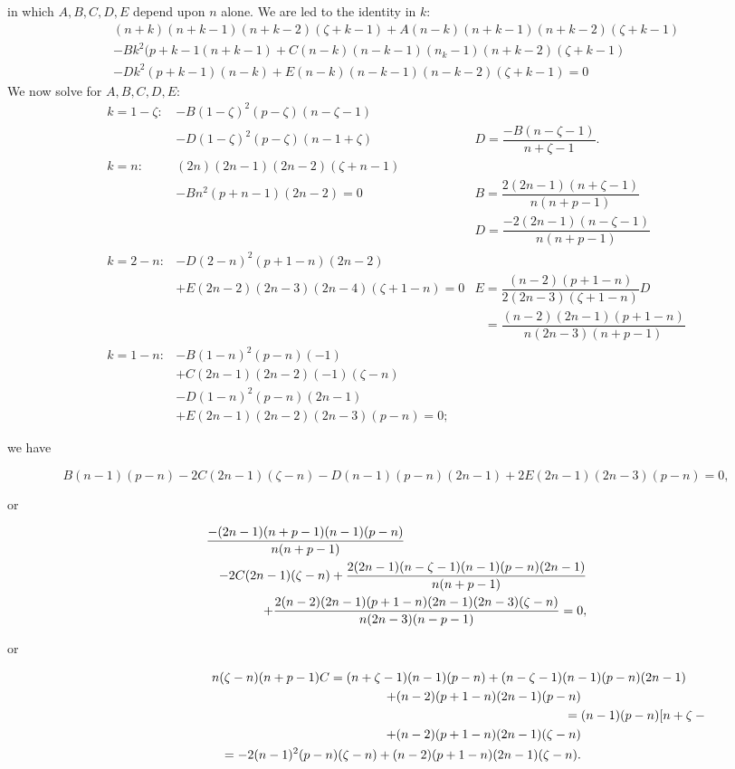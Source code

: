 \begin{solution}
in which $A,B,C,D,E$ depend upon $n$ alone. We are led to the identity in $k$:
$$\begin{array}{ll}
(n+k)(n+k-1)(n+k-2)(\zeta+k-1)+A(n-k)(n+k-1)(n+k-2)(\zeta+k-1) \\
-Bk^2(p+k-1(n+k-1) + C(n-k)(n-k-1)(n_k-1)(n+k-2)(\zeta+k-1) \\
- Dk^2(p+k-1)(n-k)+E (n-k)(n-k-1)(n-k-2)(\zeta+k-1)=0
\end{array}$$
We now solve for $A,B,C,D,E:$
$$\begin{array}{lll}
k=1-\zeta: & -B(1-\zeta)^2(p-\zeta)(n-\zeta-1) \\
& -D(1-\zeta)^2(p-\zeta)(n-1+\zeta) & D = \dfrac{-B(n-\zeta-1)}{n+\zeta-1}. \\
k=n: & (2n)(2n-1)(2n-2)(\zeta+n-1) \\
& -Bn^2(p+n-1)(2n-2)=0 & B= \dfrac{2(2n-1)(n+\zeta-1)}{n(n+p-1)} \\
& & D = \dfrac{-2(2n-1)(n-\zeta-1)}{n(n+p-1)} \\
k=2-n: & -D(2-n)^2(p+1-n)(2n-2) \\
& +E(2n-2)(2n-3)(2n-4)(\zeta+1-n)=0 & E = \dfrac{(n-2)(p+1-n)}{2(2n-3)(\zeta+1-n)}D \\
&& \phantom{E}=\dfrac{(n-2)(2n-1)(p+1-n)}{n(2n-3)(n+p-1)} \\
k=1-n: & -B(1-n)^2(p-n)(-1) \\
& + C(2n-1)(2n-2)(-1)(\zeta-n) \\
& -D(1-n)^2(p-n)(2n-1) \\
& +E(2n-1)(2n-2)(2n-3)(p-n)=0;
\end{array}$$

we have

$$B(n-1)(p-n)-2C(2n-1)(\zeta-n)-D(n-1)(p-n)(2n-1)+2E(2n-1)(2n-3)(p-n)=0,$$

or

\begin{eqnarray*}
\lefteqn{\dfrac{-(2n-1)(n+p-1)(n-1)(p-n)}{n(n+p-1)}} \\
& & - 2C(2n-1)(\zeta-n) + \dfrac{2(2n-1)(n-\zeta-1)(n-1)(p-n)(2n-1)}{n(n+p-1)} \\
& & + \dfrac{2(n-2)(2n-1)(p+1-n)(2n-1)(2n-3)(\zeta-n)}{n(2n-3)(n-p-1)} = 0,
\end{eqnarray*}

or

\begin{eqnarray*}
\lefteqn{n(\zeta-n)(n+p-1)C = (n+\zeta-1)(n-1)(p-n) + (n-\zeta-1)(n-1)(p-n)(2n-1)} \\ 
& & + (n-2)(p+1-n)(2n-1)(p-n) \\
&& =\lefteqn{(n-1)(p-n)[n+\zeta-1+(n-\zeta-1)(2n-1)]} \\
&& +(n-2)(p+1-n)(2n-1)(\zeta-n) \\
&&=-2(n-1)^2(p-n)(\zeta-n) + (n-2)(p+1-n)(2n-1)(\zeta-n).
\end{eqnarray*}


\end{solution}
